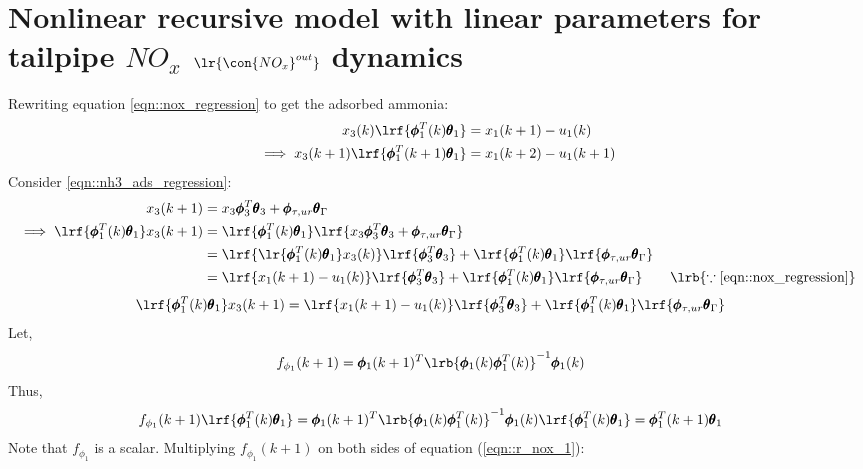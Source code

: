\section{Nonlinear recursive model with linear parameters for tailpipe $NO_x$ $\lr{\con{NO_x}^{out}}$ dynamics}
Rewriting equation \ref{eqn::nox_regression} to get the adsorbed ammonia:
\begin{align*}
        x_3(k) \lrf{\pmb \phi_1^T(k) \pmb \theta_1} &= {x_1(k+1) - u_1(k)}\\
        \implies x_3(k+1) \lrf{\pmb \phi_1^T(k+1) \pmb \theta_1} &= {x_1(k+2) - u_1(k+1)}
\end{align*}
Consider \ref{eqn::nh3_ads_regression}:
\begin{align*}
     x_3(k+1) &= x_3 \pmb \phi_3^T \pmb \theta_3 + \pmb \phi_{\tau, ur} \pmb \theta_\Gamma\\
     \implies \lrf{\pmb \phi_1^T(k) \pmb \theta_1} x_3(k+1) &= \lrf{\pmb \phi_1^T(k) \pmb \theta_1} \lrf{x_3 \pmb \phi_3^T \pmb \theta_3 + \pmb \phi_{\tau, ur} \pmb \theta_\Gamma}\\
     &= \lrf{\lr{\pmb \phi_1^T(k) \pmb \theta_1}x_3(k)} \lrf{\pmb \phi_3^T \pmb \theta_3}
     + \lrf{\pmb \phi_1^T(k) \pmb \theta_1} \lrf{\pmb \phi_{\tau, ur} \pmb \theta_\Gamma}\\
     &= \lrf{{x_1(k+1) - u_1(k)}} \lrf{\pmb \phi_3^T \pmb \theta_3}
     + \lrf{\pmb \phi_1^T(k) \pmb \theta_1} \lrf{\pmb \phi_{\tau, ur} \pmb \theta_\Gamma}  \qquad \lrb{\because \ref{eqn::nox_regression}}
\end{align*}
\begin{align}
        \lrf{\pmb \phi_1^T(k) \pmb \theta_1} x_3(k+1)
        &= \lrf{{x_1(k+1) - u_1(k)}} \lrf{\pmb \phi_3^T \pmb \theta_3} + \lrf{\pmb \phi_1^T(k) \pmb \theta_1} \lrf{\pmb \phi_{\tau, ur} \pmb \theta_\Gamma}
        \label{eqn::r_nox_1}
\end{align}
Let,
\begin{align}
        f_{\phi_1}(k+1) &= \pmb \phi_1(k+1)^T \lrb{\pmb \phi_1(k) \pmb \phi_1^T(k)}^{-1} \pmb \phi_1(k)
        \label{eqn::f_phi_1}
\end{align}
Thus,
\begin{align}
        f_{\phi_1}(k+1) \lrf{\pmb \phi_1^T(k) \pmb \theta_1} &= \pmb \phi_1(k+1)^T \lrb{\pmb \phi_1(k) \pmb \phi_1^T(k)}^{-1} \pmb \phi_1(k) \lrf{\pmb \phi_1^T(k) \pmb \theta_1}
        = \pmb \phi_1^T(k+1) \pmb \theta_1
        \label{eqn::f_phi_prop}
\end{align}
Note that $f_{\phi_1}$ is a scalar. Multiplying $f_{\phi_1}(k+1)$ on both sides of equation (\ref{eqn::r_nox_1}):
